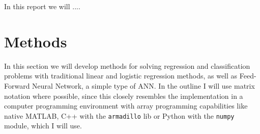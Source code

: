 \documentclass[]{article}
\begin{document}
In this report we will ....





\clearpage
\section{Methods} \label{methods}

In this section we will develop methods for solving regression and classification problems with traditional linear and logistic regression methods, as well as Feed-Forward Neural Network, a simple type of ANN. In the outline I will use matrix notation where possible, since this closely resembles the implementation in a computer programming environment with array programming capabilities like native MATLAB, C++ with the \lstinline|armadillo| lib or Python with the \lstinline|numpy| module, which I will use.
\end{document}
